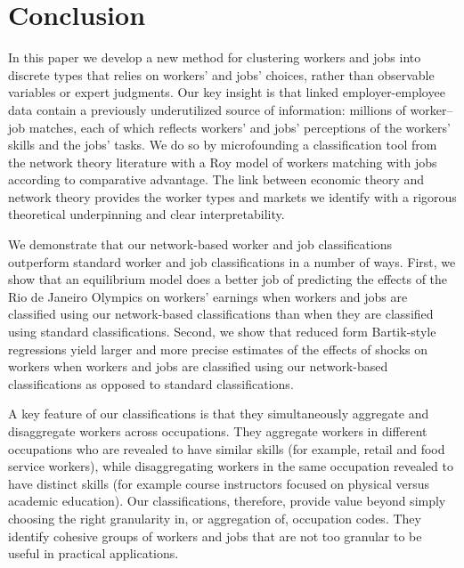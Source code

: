 \documentclass[12pt]{article}
\theoremstyle{definition}
\theoremstyle{plain}
\begin{document}
%



\clearpage


\section{Conclusion}
\label{sec:conclusion}


In this paper we develop a new method for clustering workers and jobs into discrete types that relies on workers' and jobs' choices, rather than observable variables or expert judgments. Our key insight is that linked employer-employee data contain a previously underutilized source of information: millions of worker--job matches, each of which reflects workers' and jobs' perceptions of the workers' skills and the jobs' tasks. We do so by microfounding a classification tool from the network theory literature with a Roy model of workers matching with jobs according to comparative advantage. The link between economic theory and network theory provides the worker types and markets we identify with a rigorous theoretical underpinning and clear interpretability. 

We demonstrate that our network-based worker and job classifications outperform standard worker and job classifications in a number of ways. First, we show that an equilibrium model does a better job of predicting the effects of the Rio de Janeiro Olympics on workers' earnings when workers and jobs are classified using our network-based classifications than when they are classified using standard classifications. Second, we show that reduced form Bartik-style regressions yield larger and more precise estimates of the effects of shocks on workers when workers and jobs are classified using our network-based classifications as opposed to standard classifications. 

A key feature of our classifications is that they simultaneously aggregate and disaggregate workers across occupations. They aggregate workers in different occupations who are revealed to have similar skills (for example, retail and food service workers), while disaggregating workers in the same occupation revealed to have distinct skills (for example course instructors focused on physical versus academic education). Our classifications, therefore, provide value beyond simply choosing the right granularity in, or aggregation of, occupation codes. They identify cohesive groups of workers and jobs that are not too granular to be useful in practical applications.
\end{document}
